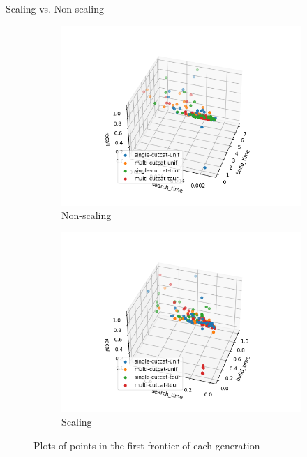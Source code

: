 \begin{frame}{Scaling vs. Non-scaling}
    \begin{figure}
        \centering
        \hfill
        \begin{subfigure}{0.49\textwidth}
            \includegraphics[width=\textwidth]{../images/report/non-scaling-frontier.png}
            \caption{Non-scaling}
        \end{subfigure}
        \hfill
        \begin{subfigure}{0.49\textwidth}
            \includegraphics[width=\textwidth]{../images/report/scaling-frontier.png}
            \caption{Scaling}
        \end{subfigure}
        \caption{Plots of points in the first frontier of each generation}
    \end{figure}
\end{frame}

